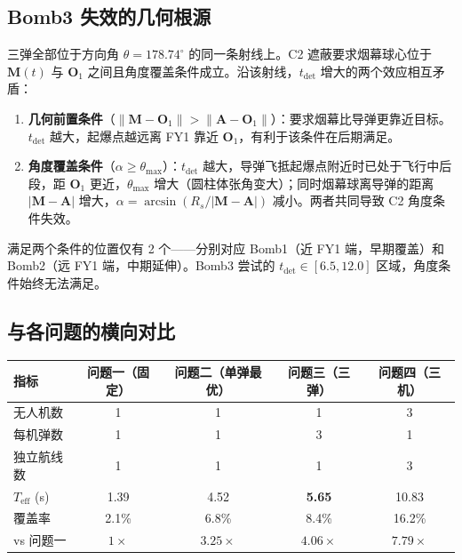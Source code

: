 \documentclass[12pt,a4paper]{ctexart}
\newcommand{\tdet}{t_{\text{det}}}
\newcommand{\Teff}{T_{\text{eff}}}
\begin{document}
\subsection{Bomb3 失效的几何根源}

三弹全部位于方向角 $\theta = 178.74^\circ$ 的同一条射线上。C2 遮蔽要求烟幕球心位于 $\mathbf{M}(t)$ 与 $\mathbf{O}_1$ 之间且角度覆盖条件成立。沿该射线，$\tdet$ 增大的两个效应相互矛盾：

\begin{enumerate}
    \item \textbf{几何前置条件}（$\|\mathbf{M}-\mathbf{O}_1\| > \|\mathbf{A}-\mathbf{O}_1\|$）：要求烟幕比导弹更靠近目标。$\tdet$ 越大，起爆点越远离 FY1 靠近 $\mathbf{O}_1$，有利于该条件在后期满足。
    \item \textbf{角度覆盖条件}（$\alpha \geq \theta_{\max}$）：$\tdet$ 越大，导弹飞抵起爆点附近时已处于飞行中后段，距 $\mathbf{O}_1$ 更近，$\theta_{\max}$ 增大（圆柱体张角变大）；同时烟幕球离导弹的距离 $|\mathbf{M} - \mathbf{A}|$ 增大，$\alpha = \arcsin(R_s/|\mathbf{M} - \mathbf{A}|)$ 减小。两者共同导致 C2 角度条件失效。
\end{enumerate}

满足两个条件的位置仅有 2 个——分别对应 Bomb1（近 FY1 端，早期覆盖）和 Bomb2（远 FY1 端，中期延伸）。Bomb3 尝试的 $\tdet \in [6.5, 12.0]$ 区域，角度条件始终无法满足。

\subsection{与各问题的横向对比}

\begin{center}
\begin{tabular}{lcccc}
\toprule
\textbf{指标} & \textbf{问题一（固定）} & \textbf{问题二（单弹最优）} & \textbf{问题三（三弹）} & \textbf{问题四（三机）} \\
\midrule
无人机数   & 1 & 1 & 1 & 3 \\
每机弹数   & 1 & 1 & 3 & 1 \\
独立航线数 & 1 & 1 & 1 & 3 \\
$\Teff$ (s) & 1.39 & 4.52 & \textbf{5.65} & 10.83 \\
覆盖率      & 2.1\% & 6.8\% & 8.4\% & 16.2\% \\
vs 问题一   & $1\times$ & $3.25\times$ & $4.06\times$ & $7.79\times$ \\
\bottomrule
\end{tabular}
\end{center}
\end{document}
